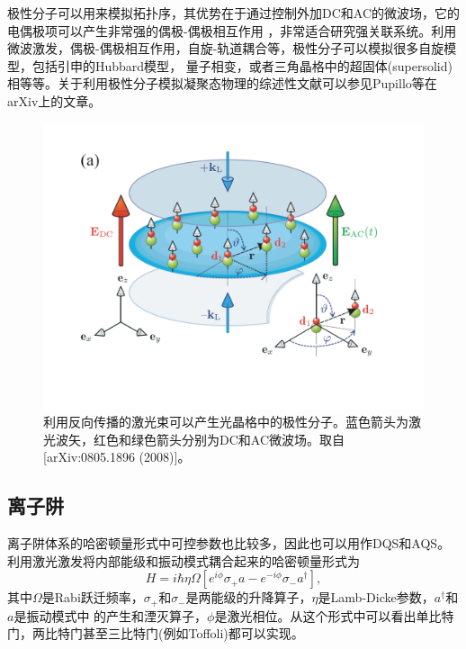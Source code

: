 极性分子可以用来模拟拓扑序\cite{polar1,polar2}，其优势在于通过控制外加DC和AC的微波场，它的电偶极项可以产生非常强的偶极-偶极相互作用
，非常适合研究强关联系统。利用微波激发，偶极-偶极相互作用，自旋-轨道耦合等，极性分子可以模拟很多自旋模型，包括引申的Hubbard模型\cite{polar3}，
量子相变\cite{polar4}，或者三角晶格中的超固体(supersolid)相\cite{polar5}等等。关于利用极性分子模拟凝聚态物理的综述性文献可以参见Pupillo等在arXiv上的文章\cite{polar6}。 \begin{figure}[htbp]
            \begin{center}
              \includegraphics[width= 0.8\columnwidth]{figures/polar.pdf}
              \caption{利用反向传播的激光束可以产生光晶格中的极性分子。蓝色箭头为激光波矢，红色和绿色箭头分别为DC和AC微波场。取自[arXiv:0805.1896 (2008)\cite{polar6}]。
              }
              \label{polar}
            \end{center}
        \end{figure}

\subsection{离子阱}

离子阱体系的哈密顿量形式中可控参数也比较多，因此也可以用作DQS和AQS。利用激光激发将内部能级和振动模式耦合起来的哈密顿量形式为
 \begin{equation}\label{ion}
 H = i\hbar \eta \Omega [e^{i\phi}\sigma_{+}a-e^{-i\phi}\sigma_{-}a^{\dagger}],
\end{equation}
其中$\Omega$是Rabi跃迁频率，$\sigma_{+}$和$\sigma_{-}$是两能级的升降算子，$\eta$是Lamb-Dicke参数，$a^{\dagger}$和$a$是振动模式中
的产生和湮灭算子，$\phi$是激光相位。从这个形式中可以看出单比特门，两比特门甚至三比特门(例如Toffoli)都可以实现。

